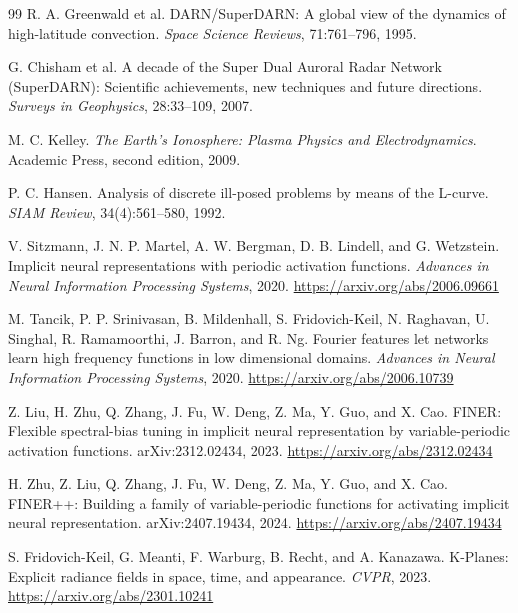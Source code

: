 \documentclass[11pt]{article}
\begin{document}
\begin{thebibliography}{99}
R. A. Greenwald et al.
\newblock DARN/SuperDARN: A global view of the dynamics of high-latitude convection.
\newblock \emph{Space Science Reviews}, 71:761--796, 1995.

G. Chisham et al.
\newblock A decade of the Super Dual Auroral Radar Network (SuperDARN): Scientific achievements, new techniques and future directions.
\newblock \emph{Surveys in Geophysics}, 28:33--109, 2007.

M. C. Kelley.
\newblock \emph{The Earth's Ionosphere: Plasma Physics and Electrodynamics}.
\newblock Academic Press, second edition, 2009.

P. C. Hansen.
\newblock Analysis of discrete ill-posed problems by means of the L-curve.
\newblock \emph{SIAM Review}, 34(4):561--580, 1992.

V. Sitzmann, J. N. P. Martel, A. W. Bergman, D. B. Lindell, and G. Wetzstein.
\newblock Implicit neural representations with periodic activation functions.
\newblock \emph{Advances in Neural Information Processing Systems}, 2020.
\newblock \url{https://arxiv.org/abs/2006.09661}

M. Tancik, P. P. Srinivasan, B. Mildenhall, S. Fridovich-Keil, N. Raghavan, U. Singhal, R. Ramamoorthi, J. Barron, and R. Ng.
\newblock Fourier features let networks learn high frequency functions in low dimensional domains.
\newblock \emph{Advances in Neural Information Processing Systems}, 2020.
\newblock \url{https://arxiv.org/abs/2006.10739}

Z. Liu, H. Zhu, Q. Zhang, J. Fu, W. Deng, Z. Ma, Y. Guo, and X. Cao.
\newblock FINER: Flexible spectral-bias tuning in implicit neural representation by variable-periodic activation functions.
\newblock arXiv:2312.02434, 2023.
\newblock \url{https://arxiv.org/abs/2312.02434}

H. Zhu, Z. Liu, Q. Zhang, J. Fu, W. Deng, Z. Ma, Y. Guo, and X. Cao.
\newblock FINER++: Building a family of variable-periodic functions for activating implicit neural representation.
\newblock arXiv:2407.19434, 2024.
\newblock \url{https://arxiv.org/abs/2407.19434}

S. Fridovich-Keil, G. Meanti, F. Warburg, B. Recht, and A. Kanazawa.
\newblock K-Planes: Explicit radiance fields in space, time, and appearance.
\newblock \emph{CVPR}, 2023.
\newblock \url{https://arxiv.org/abs/2301.10241}


\end{thebibliography}
\end{document}

